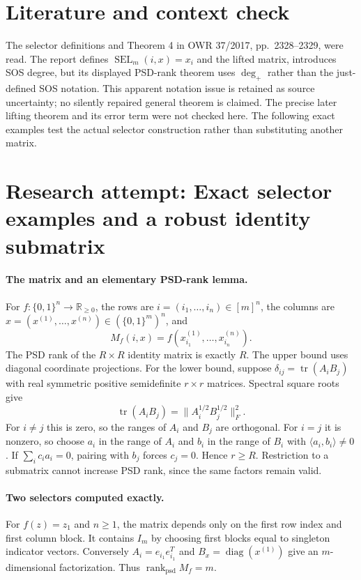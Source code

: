 \documentclass[11pt]{article}
\begin{document}
\section{Literature and context check}
The selector definitions and Theorem 4 in OWR 37/2017, pp.~2328--2329, were read. The report defines $\operatorname{SEL}_m(i,x)=x_i$ and the lifted matrix, introduces SOS degree, but its displayed PSD-rank theorem uses $\deg_+$ rather than the just-defined SOS notation. This apparent notation issue is retained as source uncertainty; no silently repaired general theorem is claimed. The precise later lifting theorem and its error term were not checked here. The following exact examples test the actual selector construction rather than substituting another matrix.
\section{Research attempt: Exact selector examples and a robust identity submatrix}

\paragraph{The matrix and an elementary PSD-rank lemma.}
For $f:\{0,1\}^n\to\mathbb R_{\ge0}$, the rows are $i=(i_1,\ldots,i_n)\in[m]^n$, the columns are $x=(x^{(1)},\ldots,x^{(n)})\in(\{0,1\}^m)^n$, and
\[
 M_f(i,x)=f(x^{(1)}_{i_1},\ldots,x^{(n)}_{i_n}).
\]
The PSD rank of the $R\times R$ identity matrix is exactly $R$. The upper bound uses diagonal coordinate projections. For the lower bound, suppose $\delta_{ij}=\operatorname{tr}(A_iB_j)$ with real symmetric positive semidefinite $r\times r$ matrices. Spectral square roots give
\[
 \operatorname{tr}(A_iB_j)=\|A_i^{1/2}B_j^{1/2}\|_F^2.
\]
For $i\ne j$ this is zero, so the ranges of $A_i$ and $B_j$ are orthogonal. For $i=j$ it is nonzero, so choose $a_i$ in the range of $A_i$ and $b_i$ in the range of $B_i$ with $\langle a_i,b_i\rangle\ne0$. If $\sum_i c_i a_i=0$, pairing with $b_j$ forces $c_j=0$. Hence $r\ge R$. Restriction to a submatrix cannot increase PSD rank, since the same factors remain valid.

\paragraph{Two selectors computed exactly.}
For $f(z)=z_1$ and $n\ge1$, the matrix depends only on the first row index and first column block. It contains $I_m$ by choosing first blocks equal to singleton indicator vectors. Conversely $A_i=e_{i_1}e_{i_1}^T$ and $B_x=\operatorname{diag}(x^{(1)})$ give an $m$-dimensional factorization. Thus $\operatorname{rank}_{\mathrm{psd}}M_f=m$.
\end{document}
